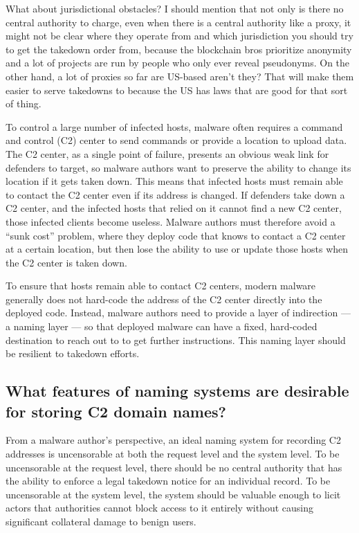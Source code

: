 \documentclass[10pt,sigconf,letterpaper]{acmart}
\begin{document}
What about jurisdictional obstacles? I should mention that not only is there no central authority 
to charge, even when there is a central authority like a proxy, it might not be clear where they 
operate from and which jurisdiction you should try to get the takedown order from, because the 
blockchain bros prioritize anonymity and a lot of projects are run by people who only ever reveal 
pseudonyms. On the other hand, a lot of proxies so far are US-based aren't they? That will make 
them easier to serve takedowns to because the US has laws that are good for that sort of thing.



To control a large number of infected hosts, malware often requires a command and control (C2) 
center 
to send commands or provide a location to upload data. 
The C2 center, as a single point of failure, presents an obvious weak link for defenders to target, 
so 
malware authors want to preserve the ability to change its location if it gets taken down. This 
means 
that infected hosts must remain able to contact the C2 center even if 
its address is changed. If defenders take down a C2 center, and the infected hosts that relied on 
it 
cannot find a new C2 center, those infected clients become useless. Malware authors must therefore 
avoid a ``sunk cost'' problem, where they deploy code that knows to contact a C2 center at a 
certain 
location, but then lose the ability to use or update those hosts when the C2 center is taken down.

To ensure that hosts remain able to contact C2 centers, modern malware generally does not hard-code 
the address of the C2 center directly into the deployed code. Instead, malware authors need to 
provide 
a layer of indirection --- a naming layer --- so that deployed malware can have a 
fixed, hard-coded destination to reach out to to get further instructions. 
This naming layer should be resilient to takedown efforts.

\subsection{What features of naming systems are desirable for storing C2 domain names?}

From a malware author's perspective, an ideal naming system for recording C2 
addresses is uncensorable at both the request level and the system level. To be 
uncensorable at the request level, there should be no central authority that 
has the ability to enforce a legal takedown notice for an individual record. To 
be uncensorable at the system level, the system should be valuable enough to 
licit actors that authorities cannot block access to it entirely without 
causing significant collateral damage to benign users.
\end{document}
